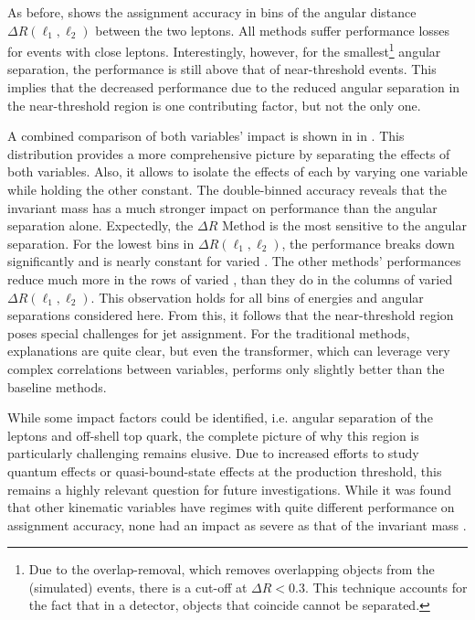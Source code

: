 As before,  shows the assignment accuracy in bins of the angular distance $\Delta R(\ell_1,\ell_2)$
between the two leptons. All methods suffer performance losses for events with close leptons. Interestingly, however, for the smallest\footnote{Due to the overlap-removal, which removes overlapping objects from the (simulated) events, there is a cut-off at $\Delta R<0.3$. This technique accounts for the fact that in a detector, objects that coincide cannot be separated.} angular separation, the performance is still above that of near-threshold events. This implies that the decreased performance due to the reduced angular separation in the near-threshold region is one contributing factor, but not the only one.

A combined comparison of both variables' impact is shown in  in . This distribution provides a more comprehensive picture by separating the effects of both variables. Also, it allows to isolate the effects of each by varying one variable while holding the other constant. The double-binned accuracy reveals that the invariant mass \mttbar has a much stronger impact on performance than the angular separation alone. Expectedly, the $\Delta R$ Method is the most sensitive to the angular separation.
For the lowest bins in $\Delta R(\ell_1,\ell_2)$, the performance breaks down significantly and is nearly constant for varied \mttbar.
The other methods' performances reduce much more in the rows of varied \mttbar, than they do in the columns of varied $\Delta R(\ell_1,\ell_2)$. This observation holds for all bins of energies and angular separations considered here.
From this, it follows that the near-threshold region poses special challenges for jet assignment. For the traditional methods, explanations are quite clear, but even the transformer, which can leverage very complex correlations between variables, performs only slightly better than the baseline methods.

While some impact factors could be identified, i.e. angular separation of the leptons and off-shell top quark, the complete picture of why this region is particularly challenging remains elusive. Due to increased efforts to study quantum effects or quasi-bound-state effects at the production threshold, this remains a highly relevant question for future investigations.
While it was found that other kinematic variables have regimes with quite different performance on assignment accuracy, none had an impact as severe as that of the invariant mass \mttbar.

